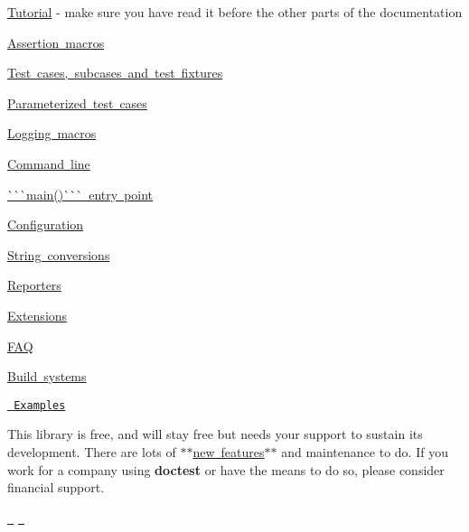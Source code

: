\begin{DoxyItemize}
\item \mbox{\hyperlink{md__c___users__u_s_e_r_source_repos_bzareva_star_wars_universe_0_1_doctest_doc_markdown_tutorial}{Tutorial}} -\/ make sure you have read it before the other parts of the documentation
\item \mbox{\hyperlink{md__c___users__u_s_e_r_source_repos_bzareva_star_wars_universe_0_1_doctest_doc_markdown_assertions}{Assertion macros}}
\item \mbox{\hyperlink{md__c___users__u_s_e_r_source_repos_bzareva_star_wars_universe_0_1_doctest_doc_markdown_testcases}{Test cases, subcases and test fixtures}}
\item \mbox{\hyperlink{md__c___users__u_s_e_r_source_repos_bzareva_star_wars_universe_0_1_doctest_doc_markdown_parameterized_tests}{Parameterized test cases}}
\item \mbox{\hyperlink{md__c___users__u_s_e_r_source_repos_bzareva_star_wars_universe_0_1_doctest_doc_markdown_logging}{Logging macros}}
\item \mbox{\hyperlink{md__c___users__u_s_e_r_source_repos_bzareva_star_wars_universe_0_1_doctest_doc_markdown_commandline}{Command line}}
\item \mbox{\hyperlink{md__c___users__u_s_e_r_source_repos_bzareva_star_wars_universe_0_1_doctest_doc_markdown_main}{\`{}\`{}\`{}main()\`{}\`{}\`{} entry point}}
\item \mbox{\hyperlink{md__c___users__u_s_e_r_source_repos_bzareva_star_wars_universe_0_1_doctest_doc_markdown_configuration}{Configuration}}
\item \mbox{\hyperlink{md__c___users__u_s_e_r_source_repos_bzareva_star_wars_universe_0_1_doctest_doc_markdown_stringification}{String conversions}}
\item \mbox{\hyperlink{md__c___users__u_s_e_r_source_repos_bzareva_star_wars_universe_0_1_doctest_doc_markdown_reporters}{Reporters}}
\item \mbox{\hyperlink{md__c___users__u_s_e_r_source_repos_bzareva_star_wars_universe_0_1_doctest_doc_markdown_extensions}{Extensions}}
\item \mbox{\hyperlink{md__c___users__u_s_e_r_source_repos_bzareva_star_wars_universe_0_1_doctest_doc_markdown_faq}{FAQ}}
\item \mbox{\hyperlink{md__c___users__u_s_e_r_source_repos_bzareva_star_wars_universe_0_1_doctest_doc_markdown_build_systems}{Build systems}}
\item \href{../../examples}{\texttt{ Examples}}
\end{DoxyItemize}

This library is free, and will stay free but needs your support to sustain its development. There are lots of \mbox{\hyperlink{md__c___users__u_s_e_r_source_repos_bzareva_star_wars_universe_0_1_doctest_doc_markdown_roadmap}{$\ast$$\ast$new features$\ast$$\ast$}} and maintenance to do. If you work for a company using {\bfseries{doctest}} or have the means to do so, please consider financial support.

\href{http://www.patreon.com/onqtam}{\texttt{ }} \href{https://www.paypal.me/onqtam/10}{\texttt{ }}





